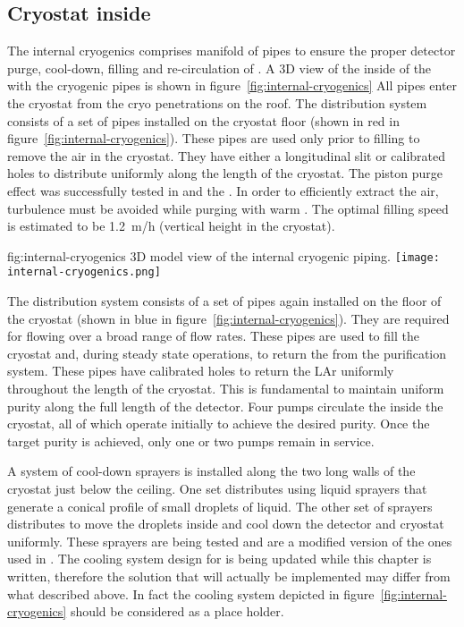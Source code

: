 \subsection{Cryostat inside}
The internal cryogenics comprises manifold of pipes to ensure the proper detector purge, cool-down, filling and re-circulation of .
A 3D view of the inside of the  with the cryogenic pipes is shown in figure~\ref{fig:internal-cryogenics}
All pipes enter the cryostat from the cryo penetrations on the roof.
The  distribution system consists of a set of pipes installed on the cryostat floor (shown in red in figure~\ref{fig:internal-cryogenics}).
These pipes are used only prior to filling to remove the air in the cryostat.
They have either a longitudinal slit or calibrated holes to distribute  uniformly along the length of the cryostat.
The piston purge effect was successfully tested in  and the .
In order to efficiently extract the air, turbulence must be avoided while purging with warm .
The optimal filling speed is estimated to be 1.2~m/h (vertical height in the cryostat).
\begin{dunefigure}{fig:internal-cryogenics}
{3D model view of the internal cryogenic piping.}
\texttt{[image: internal-cryogenics.png]}
\end{dunefigure}

The  distribution system consists of a set of pipes again installed on the floor of the cryostat (shown in blue in figure~\ref{fig:internal-cryogenics}).
They are required for flowing  over a broad range of flow rates.
These pipes are used to fill the cryostat and, during steady state operations, to return the  from the purification system.
These pipes have calibrated holes to return the LAr uniformly throughout the length of the cryostat.
This is fundamental to maintain uniform purity along the full length of the detector.
Four pumps circulate the  inside the cryostat, all of which operate initially to achieve the desired purity.
Once the target purity is achieved, only one or two pumps remain in service.

A system of cool-down sprayers is installed along the two long walls of the cryostat just below the ceiling.
One set distributes  using liquid sprayers that generate a conical profile of small droplets of liquid.
The other set of sprayers distributes  to move the  droplets inside and cool down the detector and cryostat uniformly.
These sprayers are being tested  and are a modified version of the ones used in .
The cooling system design for  is being updated while this chapter is written, therefore the solution that will actually be implemented may differ from what described above.
In fact the cooling system depicted in figure~\ref{fig:internal-cryogenics} should be considered as a place holder.

